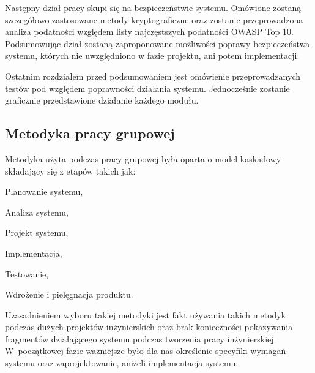 Następny dział pracy skupi się na bezpieczeństwie systemu. Omówione zostaną szczegółowo zastosowane metody kryptograficzne oraz zostanie przeprowadzona analiza podatności względem listy najczęstszych podatności OWASP Top 10. Podsumowując dział zostaną zaproponowane możliwości poprawy  bezpieczeństwa systemu, których nie uwzględniono w fazie projektu, ani potem implementacji.

Ostatnim rozdziałem przed podsumowaniem jest omówienie przeprowadzanych testów pod względem poprawności działania systemu. Jednocześnie zostanie graficznie przedstawione działanie każdego modułu.

\newpage
\subsection{Metodyka pracy grupowej}
Metodyka użyta podczas pracy grupowej była oparta o model kaskadowy składający się z etapów takich jak:
\begin{itemize*}
	\item Planowanie systemu,
	\item Analiza systemu,
	\item Projekt systemu,
	\item Implementacja,
	\item Testowanie,
	\item Wdrożenie i pielęgnacja produktu.
\end{itemize*}

Uzasadnieniem wyboru takiej metodyki jest fakt używania takich metodyk podczas dużych projektów inżynierskich oraz brak konieczności pokazywania fragmentów działającego systemu podczas tworzenia pracy inżynierskiej. W~początkowej fazie ważniejsze było dla nas określenie specyfiki wymagań systemu oraz zaprojektowanie, aniżeli implementacja systemu.\cite{waterfall}